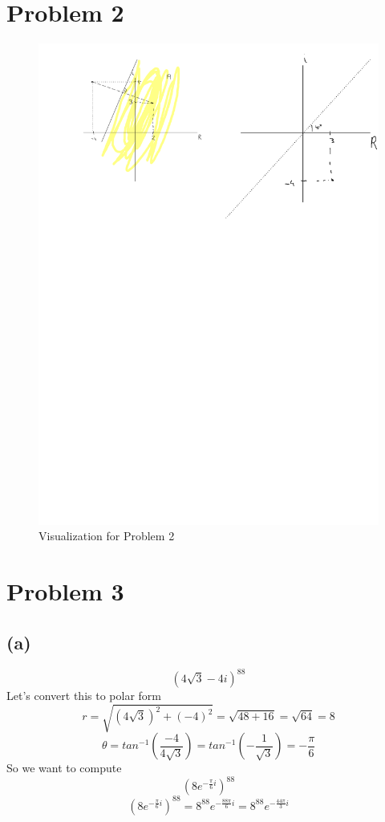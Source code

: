 \documentclass{article}
\begin{document}
\section*{Problem 2}


\begin{figure}[H]
    \centering
    \includegraphics[width=\textwidth]{2025-04-28-Note-13-03.pdf}
    \caption{Visualization for Problem 2}
    \label{fig:problem2}
\end{figure}


\section*{Problem 3}
\subsection*{(a)}
\[
   (4\sqrt{3} - 4i)^{88}
\]
Let's convert this to polar form
\[
   r = \sqrt{(4\sqrt{3})^2 + (-4)^2} = \sqrt{48 + 16} = \sqrt{64} = 8
\]
\[
   \theta = tan^{-1}(\frac{-4}{4\sqrt{3}}) = tan^{-1}(-\frac{1}{\sqrt{3}}) = -\frac{\pi}{6}
\]
So we want to compute
\[
   (8e^{-\frac{\pi}{6}i})^{88}
\]
\[
   (8e^{-\frac{\pi}{6}i})^{88} = 8^{88}e^{-\frac{88\pi}{6}i} = 8^{88}e^{-\frac{44\pi}{3}i}
\]
\end{document}
